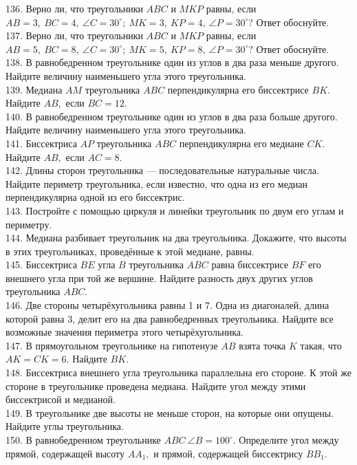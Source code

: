 136. Верно ли, что треугольники $ABC$ и $MKP$ равны, если $AB=3,\ BC=4,\ \angle C=30^\circ;\ MK=3,\ KP=4,\ \angle P=30^\circ?$ Ответ обоснуйте.\\
137. Верно ли, что треугольники $ABC$ и $MKP$ равны, если $AB=5,\ BC=8,\ \angle C=30^\circ;\ MK=5,\ KP=8,\ \angle P=30^\circ?$ Ответ обоснуйте.\\
138. В равнобедренном треугольнике один из углов в два раза меньше другого. Найдите величину наименьшего угла этого треугольника.\\
139. Медиана $AM$ треугольника $ABC$ перпендикулярна его биссектрисе $BK.$ Найдите $AB,$ если $BC=12.$\\
140. В равнобедренном треугольнике один из углов в два раза больше другого. Найдите величину наименьшего угла этого треугольника.\\
141. Биссектриса $AP$ треугольника $ABC$ перпендикулярна его медиане $CK.$ Найдите $AB,$ если $AC=8.$\\
142. Длины сторон треугольника --- последовательные натуральные числа. Найдите периметр треугольника, если известно, что одна из его медиан перпендикулярна одной из его биссектрис.\\
143. Постройте с помощью циркуля и линейки треугольник по двум его углам и периметру.\\
144. Медиана разбивает треугольник на два треугольника. Докажите, что высоты в этих треугольниках, проведённые к этой медиане, равны.\\
145. Биссектриса $BE$ угла $B$ треугольника $ABC$ равна биссектрисе $BF$ его внешнего угла при той же вершине. Найдите разность двух других углов треугольника $ABC.$\\
146. Две стороны четырёхугольника равны 1 и 7. Одна из диагоналей, длина которой равна 3, делит его на два равнобедренных треугольника. Найдите все возможные значения периметра этого четырёхугольника.\\
147. В прямоугольном треугольнике на гипотенузе $AB$ взята точка $K$ такая, что $AK=CK=6.$ Найдите $BK.$\\
148. Биссектриса внешнего угла треугольника параллельна его стороне. К этой же стороне в треугольнике проведена медиана. Найдите угол между этими биссектрисой и медианой.\\
149. В треугольнике две высоты не меньше сторон, на которые они опущены. Найдите углы треугольника.\\
150. В равнобедренном треугольнике $ABC\ \angle B = 100^\circ.$ Определите угол между прямой, содержащей высоту $AA_1,$ и прямой, содержащей биссектрису $BB_1.$\\
